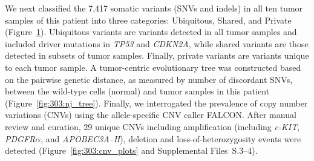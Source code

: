 \begin{figure}[htbp]
	\label{fig:303:variants_plots}
\end{figure}
We next classified the 7,417 somatic variants (SNVs and indels) in all ten tumor samples of this patient into three categories: Ubiquitous, Shared, and Private (Figure~\ref{fig:303:variants_plots}). Ubiquitous variants are variants detected in all tumor samples and included driver mutations in \textit{TP53} and \textit{CDKN2A}, while shared variants are those detected in subsets of tumor samples. Finally, private variants are variants unique to each tumor sample. A tumor-centric evolutionary tree was constructed based on the pairwise genetic distance, as measured by number of discordant SNVs, between the wild-type cells (normal) and tumor samples in this patient (Figure~\ref{fig:303:nj_tree}). Finally, we interrogated the prevalence of copy number variations (CNVs) using the allele-specific CNV caller FALCON. After manual review and curation, 29 unique CNVs including amplification (including \textit{c-KIT}, \textit{PDGFR}$\mathit{\alpha}$, and \textit{APOBEC3A--H}), deletion and loss-of-heterozygosity events were detected (Figure~\ref{fig:303:cnv_plots} and Supplemental Files~S\thechapter{}.3--4).

